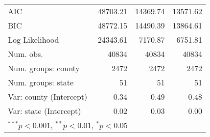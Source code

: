 \begin{tabular}{l D{)}{)}{11)3} D{)}{)}{11)3} D{)}{)}{11)3} }
\midrule
AIC                                         & 48703.21             & 14369.74              & 13571.62              \\
BIC                                         & 48772.15             & 14490.39              & 13864.61              \\
Log Likelihood                              & -24343.61            & -7170.87              & -6751.81              \\
Num. obs.                                   & 40834                & 40834                 & 40834                 \\
Num. groups: county                         & 2472                 & 2472                  & 2472                  \\
Num. groups: state                          & 51                   & 51                    & 51                    \\
Var: county (Intercept)                     & 0.34                 & 0.49                  & 0.48                  \\
Var: state (Intercept)                      & 0.02                 & 0.03                  & 0.00                  \\
\bottomrule
{}
\end{tabular}
